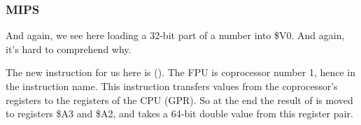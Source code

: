 \subsubsection{MIPS}



And again, we see here  loading a 32-bit part of a \Tdouble number into \$V0.
And again, it's hard to comprehend why.


The new instruction for us here is  ().
The FPU is coprocessor number 1, hence  in the instruction name.
This instruction transfers values from the coprocessor's registers to the registers of the CPU (\ac{GPR}).
So at the end the result of  is moved to registers \$A3 and \$A2, 
and \printf takes a 64-bit double value from this register pair.

